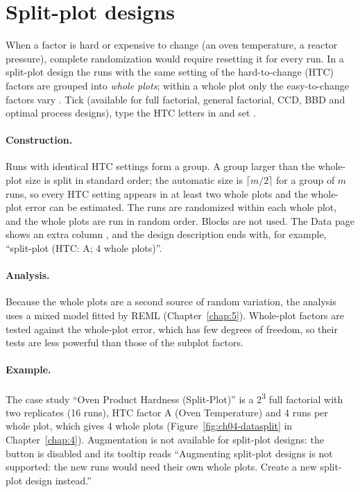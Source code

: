 \section{Split-plot designs}
\label{sec:ch03-splitplot}
When a factor is hard or expensive to change (an oven temperature, a reactor pressure), complete randomization would
require resetting it for every run. In a split-plot design the runs with the same setting of the hard-to-change
(HTC) factors are grouped into \emph{whole plots}; within a whole plot only the easy-to-change factors vary
\citep{goos2011}. Tick  (available for full factorial, general factorial,
CCD, BBD and optimal process designs), type the HTC letters in  and set .

\paragraph{Construction.} Runs with identical HTC settings form a group. A group larger than the whole-plot size is
split in standard order; the automatic size is $\lceil m/2 \rceil$ for a group of $m$ runs, so every HTC setting
appears in at least two whole plots and the whole-plot error can be estimated. The runs are randomized within each
whole plot, and the whole plots are run in random order. Blocks are not used. The Data page shows an extra column
, and the design description ends with, for example, ``split-plot (HTC: A; 4 whole plots)''.

\paragraph{Analysis.} Because the whole plots are a second source of random variation, the analysis uses a mixed
model fitted by REML (Chapter~\ref{chap:5}). Whole-plot factors are tested against the whole-plot error, which has few degrees
of freedom, so their tests are less powerful than those of the subplot factors.

\paragraph{Example.} The case study ``Oven Product Hardness (Split-Plot)'' is a 2\textsuperscript{3} full
factorial with two replicates (16 runs), HTC factor A (Oven Temperature) and 4 runs per whole plot, which gives 4
whole plots (Figure~\ref{fig:ch04-datasplit} in Chapter~\ref{chap:4}). Augmentation is not available for split-plot
designs: the  button is disabled and its tooltip reads ``Augmenting split-plot designs is not
supported: the new runs would need their own whole plots. Create a new split-plot design instead.''

